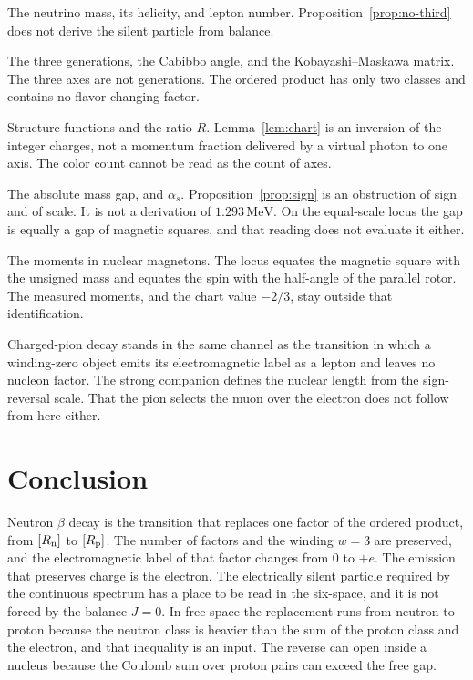 \documentclass[a4paper]{article}
\begin{document}
The neutrino mass, its helicity, and lepton number. Proposition~\ref{prop:no-third} does not derive the silent particle from balance.

The three generations, the Cabibbo angle, and the Kobayashi--Maskawa matrix. The three axes are not generations. The ordered product has only two classes and contains no flavor-changing factor.

Structure functions and the ratio \(R\). Lemma~\ref{lem:chart} is an inversion of the integer charges, not a momentum fraction delivered by a virtual photon to one axis. The color count cannot be read as the count of axes.

The absolute mass gap, and \(\alpha_s\). Proposition~\ref{prop:sign} is an obstruction of sign and of scale. It is not a derivation of \(1.293\,\mathrm{MeV}\). On the equal-scale locus the gap is equally a gap of magnetic squares, and that reading does not evaluate it either.

The moments in nuclear magnetons. The locus equates the magnetic square with the unsigned mass and equates the spin with the half-angle of the parallel rotor. The measured moments, and the chart value \(-2/3\), stay outside that identification.

Charged-pion decay stands in the same channel as the transition in which a winding-zero object emits its electromagnetic label as a lepton and leaves no nucleon factor. The strong companion defines the nuclear length from the sign-reversal scale. That the pion selects the muon over the electron does not follow from here either.

\section{Conclusion}
\label{sec:conclusion}

Neutron \(\beta\) decay is the transition that replaces one factor of the ordered product, from \([R_{\rm n}]\) to \([R_{\rm p}]\). The number of factors and the winding \(w=3\) are preserved, and the electromagnetic label of that factor changes from \(0\) to \(+e\). The emission that preserves charge is the electron. The electrically silent particle required by the continuous spectrum has a place to be read in the six-space, and it is not forced by the balance \(J=0\). In free space the replacement runs from neutron to proton because the neutron class is heavier than the sum of the proton class and the electron, and that inequality is an input. The reverse can open inside a nucleus because the Coulomb sum over proton pairs can exceed the free gap.
\end{document}
